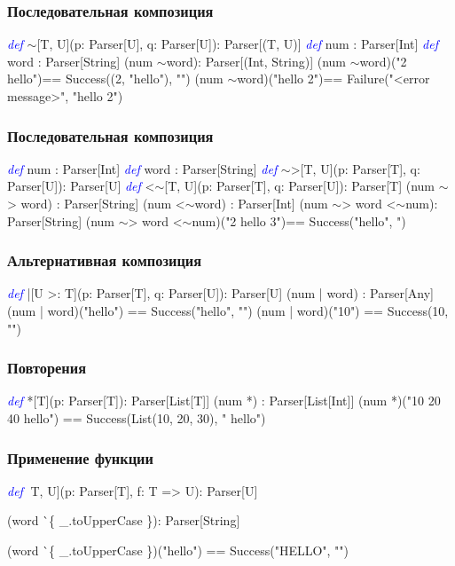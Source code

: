 \documentclass{beamer}
\newcommand{\mytilde}{$\sim$}
\newcommand{\keyword}[1]{\textcolor{blue}{\textsl{#1}}}
\begin{document}
\begin{frame}[fragile]
  \frametitle{Последовательная композиция}
  \begin{semiverbatim}
\keyword{def} \mytilde[T, U](p: Parser[U], q: Parser[U]): Parser[(T, U)]
\pause
\keyword{def} num : Parser[Int]
\keyword{def} word : Parser[String]
\pause
(num \mytilde word)\pause : Parser[(Int, String)]
\pause
(num \mytilde word)("2 hello")\pause == Success((2, "hello"), "")
\pause
(num \mytilde word)("hello 2")\pause == Failure("<error message>",
                                    "hello 2")
  \end{semiverbatim}
\end{frame}

\begin{frame}[fragile]
  \frametitle{Последовательная композиция}
  \begin{semiverbatim}
\keyword{def} num : Parser[Int]
\keyword{def} word : Parser[String]
\pause
\keyword{def} \mytilde>[T, U](p: Parser[T], q: Parser[U]): Parser[U]
\keyword{def} <\mytilde[T, U](p: Parser[T], q: Parser[U]): Parser[T]
\pause
(num \mytilde> word) : Parser[String]
(num <\mytilde word) : Parser[Int]
\pause
(num \mytilde> word <\mytilde num)\pause : Parser[String]
\pause
(num \mytilde> word <\mytilde num)("2 hello 3")\pause == Success("hello", ")
  \end{semiverbatim}
\end{frame}

\begin{frame}[fragile]
  \frametitle{Альтернативная композиция}
  \begin{semiverbatim}
\keyword{def} |[U >: T](p: Parser[T], q: Parser[U]): Parser[U]
\pause
(num | word) : Parser[Any]
\pause
(num | word)("hello") == Success("hello", "")
(num | word)("10") == Success(10, "")
  \end{semiverbatim}
\end{frame}

\begin{frame}[fragile]
  \frametitle{Повторения}
  \begin{semiverbatim}
\keyword{def} *[T](p: Parser[T]): Parser[List[T]]
\pause
(num *) : Parser[List[Int]]
\pause
(num *)("10 20 40 hello") == Success(List(10, 20, 30),
                                     " hello")
  \end{semiverbatim}
\end{frame}

\begin{frame}[fragile]
  \frametitle{Применение функции}
  \begin{semiverbatim}
\keyword{def} ^^[T, U](p: Parser[T], f: T => U): Parser[U]\pause

(word ^^ \{ _.toUpperCase \})\pause : Parser[String]\pause

(word ^^ \{ _.toUpperCase \})("hello") == Success("HELLO",
                                                "")
  \end{semiverbatim}
\end{frame}
\end{document}
